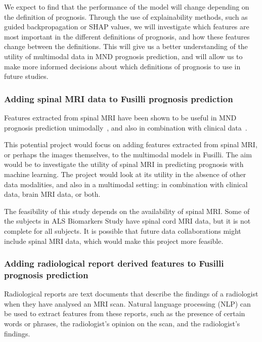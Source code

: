 We expect to find that the performance of the model will change depending on the definition of prognosis.
Through the use of explainability methods, such as guided backpropagation or SHAP values, we will investigate which features are most important in the different definitions of prognosis, and how these features change between the definitions.
This will give us a better understanding of the utility of multimodal data in MND prognosis prediction, and will allow us to make more informed decisions about which definitions of prognosis to use in future studies.


\subsubsection*{Adding spinal MRI data to Fusilli prognosis prediction}

Features extracted from spinal MRI have been shown to be useful in MND prognosis prediction unimodally~\cite{brancoSpinalCordAtrophy2014, grolezMRICervicalSpinal2018}, and also in combination with clinical data~\cite{querinSpinalCordMultiparametric2017}.

This potential project would focus on adding features extracted from spinal MRI, or perhaps the images themselves, to the multimodal models in Fusilli.
The aim would be to investigate the utility of spinal MRI in predicting prognosis with machine learning.
The project would look at its utility in the absence of other data modalities, and also in a multimodal setting: in combination with clinical data, brain MRI data, or both.

The feasibility of this study depends on the availability of spinal MRI.
Some of the subjects in ALS Biomarkers Study have spinal cord MRI data, but it is not complete for all subjects.
It is possible that future data collaborations might include spinal MRI data, which would make this project more feasible.

\subsubsection{Adding radiological report derived features to Fusilli prognosis prediction}

Radiological reports are text documents that describe the findings of a radiologist when they have analysed an MRI scan.
Natural language processing (NLP) can be used to extract features from these reports, such as the presence of certain words or phrases, the radiologist's opinion on the scan, and the radiologist's findings.

